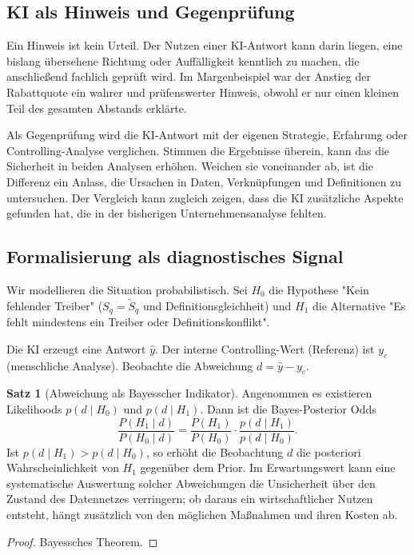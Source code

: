 \documentclass[a4paper,12pt]{article}
\theoremstyle{definition}
\newtheorem{satz}[definition]{Satz}
\begin{document}
\subsection{KI als Hinweis und Gegenprüfung}
Ein Hinweis ist kein Urteil. Der Nutzen einer KI-Antwort kann darin liegen, eine bislang übersehene Richtung oder Auffälligkeit kenntlich zu machen, die anschließend fachlich geprüft wird. Im Margenbeispiel war der Anstieg der Rabattquote ein wahrer und prüfenswerter Hinweis, obwohl er nur einen kleinen Teil des gesamten Abstands erklärte.

Als Gegenprüfung wird die KI-Antwort mit der eigenen Strategie, Erfahrung oder Controlling-Analyse verglichen. Stimmen die Ergebnisse überein, kann das die Sicherheit in beiden Analysen erhöhen. Weichen sie voneinander ab, ist die Differenz ein Anlass, die Ursachen in Daten, Verknüpfungen und Definitionen zu untersuchen. Der Vergleich kann zugleich zeigen, dass die KI zusätzliche Aspekte gefunden hat, die in der bisherigen Unternehmensanalyse fehlten.

\subsection{Formalisierung als diagnostisches Signal}
Wir modellieren die Situation probabilistisch. Sei $H_0$ die Hypothese "Kein fehlender Treiber" (\(S_q = \tilde S_q\) und Definitionsgleichheit) und $H_1$ die Alternative "Es fehlt mindestens ein Treiber oder Definitionskonflikt".

Die KI erzeugt eine Antwort $\hat y$. Der interne Controlling-Wert (Referenz) ist $y_c$ (menschliche Analyse). Beobachte die Abweichung $d=\hat y-y_c$.

\begin{satz}[Abweichung als Bayesscher Indikator]
Angenommen es existieren Likelihoods $p(d\mid H_0)$ und $p(d\mid H_1)$. Dann ist die Bayes-Posterior Odds
\[
\frac{P(H_1\mid d)}{P(H_0\mid d)} = \frac{P(H_1)}{P(H_0)}\cdot\frac{p(d\mid H_1)}{p(d\mid H_0)}.
\]
Ist $p(d\mid H_1)>p(d\mid H_0)$, so erhöht die Beobachtung $d$ die posteriori Wahrscheinlichkeit von $H_1$ gegenüber dem Prior. Im Erwartungswert kann eine systematische Auswertung solcher Abweichungen die Unsicherheit über den Zustand des Datennetzes verringern; ob daraus ein wirtschaftlicher Nutzen entsteht, hängt zusätzlich von den möglichen Maßnahmen und ihren Kosten ab.
\end{satz}
\begin{proof}
Bayessches Theorem.
\end{proof}
\end{document}
